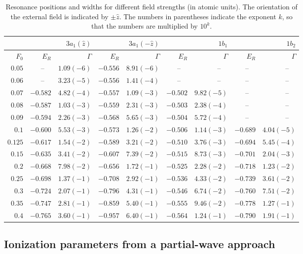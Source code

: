\begin{table}[t]
\centering
\caption{\label{tab:3a1_results} Resonance positions and widths for
  different field strengths (in atomic units). The orientation of the
  external field is indicated by $\pm\hat{z}$. The numbers in
  parentheses indicate the exponent $k$, so that the numbers are
  multiplied by $10^{k}$.}
\begin{tabular}{rrrrrrrrr}
\toprule
&& $3a_{1}(\hat{z})$ && $3a_{1}(-\hat{z})$ && $1b_{1}$ && $1b_{2}$ \\
\midrule
$F_{0}$&$E_{R}$&$\Gamma$&$E_{R}$&$\Gamma$&$E_{R}$&$\Gamma$&$E_{R}$&$\Gamma$ \\
\midrule
$0.05$ &   --~~ &$1.09(-6)$&$-0.556$&$8.91(-6)$ & --~~ & --~~ & --~~ & --~~ \\
$0.06$ &   --~~ &$3.23(-5)$&$-0.556$&$1.41(-4)$ & --~~ & --~~ & --~~ & --~~ \\
$0.07$ &$-0.582$&$4.82(-4)$&$-0.557$&$1.09(-3)$&$-0.502$&$9.82(-5)$ & --~~ & --~~ \\
$0.08$ &$-0.587$&$1.03(-3)$&$-0.559$&$2.31(-3)$&$-0.503$&$2.38(-4)$ & --~~ & --~~ \\
$0.09$ &$-0.594$&$2.26(-3)$&$-0.568$&$5.65(-3)$&$-0.504$&$5.72(-4)$ & --~~ & --~~ \\
$0.1$  &$-0.600$&$5.53(-3)$&$-0.573$&$1.26(-2)$&$-0.506$&$1.14(-3)$&$-0.689$&$4.04(-5)$\\
$0.125$&$-0.617$&$1.54(-2)$&$-0.589$&$3.21(-2)$&$-0.510$&$3.76(-3)$&$-0.694$&$5.45(-4)$\\
$0.15$ &$-0.635$&$3.41(-2)$&$-0.607$&$7.39(-2)$&$-0.515$&$8.73(-3)$&$-0.701$&$2.04(-3)$\\
$0.2$  &$-0.668$&$7.98(-2)$&$-0.656$&$1.72(-1)$&$-0.525$&$2.28(-2)$&$-0.718$&$1.23(-2)$\\
$0.25$ &$-0.698$&$1.37(-1)$&$-0.708$&$2.92(-1)$&$-0.536$&$4.33(-2)$&$-0.739$&$3.61(-2)$\\
$0.3$  &$-0.724$&$2.07(-1)$&$-0.796$&$4.31(-1)$&$-0.546$&$6.74(-2)$&$-0.760$&$7.51(-2)$\\
$0.35$ &$-0.747$&$2.81(-1)$&$-0.859$&$5.40(-1)$&$-0.555$&$9.46(-2)$&$-0.778$&$1.27(-1)$\\
$0.4$  &$-0.765$&$3.60(-1)$&$-0.957$&$6.40(-1)$&$-0.564$&$1.24(-1)$&$-0.790$&$1.91(-1)$\\
\bottomrule
\end{tabular}
\end{table}

\subsection{Ionization parameters from a partial-wave approach}
\label{ch:cap_results}

